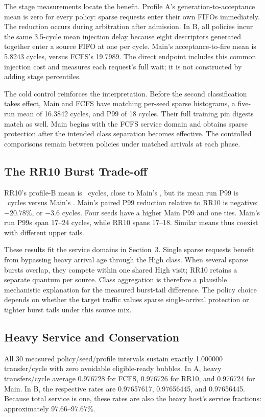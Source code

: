 The stage measurements locate the benefit. Profile A's generation-to-acceptance
mean is zero for every policy: sparse requests enter their own FIFOs immediately.
The reduction occurs during arbitration after admission. In B, all policies
incur the same 3.5-cycle mean injection delay because eight descriptors generated
together enter a source FIFO at one per cycle. Main's acceptance-to-fire mean is
5.8243 cycles, versus FCFS's 19.7989. The direct endpoint includes this common
injection cost and measures each request's full wait; it is not constructed by
adding stage percentiles.

The cold control reinforces the interpretation. Before the second classification
takes effect, Main and FCFS have matching per-seed sparse histograms, a
five-run mean of 16.3842 cycles, and P99 of 18 cycles. Their full training pin
digests match as well. Main begins with the FCFS service domain and obtains
sparse protection after the intended class separation becomes effective.
The controlled comparisons remain between policies under matched arrivals at
each phase.

\subsection{The RR10 Burst Trade-off}
RR10's profile-B mean is \HSMeanBRR\ cycles, close to Main's \HSMeanBMain,
but its mean run P99 is \HSPtailBRR\ cycles versus Main's \HSPtailBMain.
Main's paired P99 reduction relative to RR10 is negative: $-20.78\%$, or
$-3.6$ cycles. Four seeds have a higher Main P99 and one ties. Main's run P99s
span 17--24 cycles, while RR10 spans 17--18. Similar means thus coexist with
different upper tails.

These results fit the service domains in Section~3. Single sparse requests
benefit from bypassing heavy arrival age through the High class. When several
sparse bursts overlap, they compete within one shared High visit; RR10 retains
a separate quantum per source. Class aggregation is therefore a plausible
mechanistic explanation for the measured burst-tail difference. The policy
choice depends on whether the target traffic values sparse single-arrival
protection or tighter burst tails under this source mix.

\subsection{Heavy Service and Conservation}
All 30 measured policy/seed/profile intervals sustain exactly 1.000000
transfer/cycle with zero avoidable eligible-ready bubbles. In A, heavy
transfers/cycle average 0.976728 for FCFS, 0.976726 for RR10, and 0.976724
for Main. In B, the respective rates are 0.97657617, 0.97656445, and
0.97656445. Because total service is one, these rates are also the heavy
host's service fractions: approximately 97.66--97.67\%.


